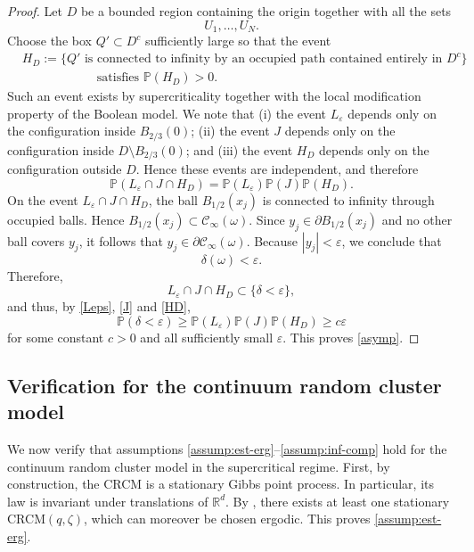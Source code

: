 \documentclass[11pt]{article}
\renewcommand{\P}{\mathbb P}
\theoremstyle{rem}
\begin{document}
\begin{proof}
\medskip

Let $D$ be a bounded region containing the origin together with all the sets
\[
U_1,\dots,U_N.
\]
Choose the box
$Q'\subset D^c$
sufficiently large so that the event
\begin{equation}\label{HD}
\begin{aligned}
&H_D
:=
\bigg\{
Q'
\text{ is connected to infinity by an occupied path contained entirely in }D^c
\bigg\} \\
&\qquad\qquad\qquad \mbox{satisfies $\P(H_D)>0$}. 
\end{aligned}
\end{equation}
Such an event exists by supercriticality together with the local modification property of the Boolean model. We note that (i) the event $L_\varepsilon$ depends only on the configuration inside
$B_{2/3}(0)$; (ii)
the event $J$ depends only on the configuration inside
$D\setminus B_{2/3}(0)$;
and (iii) the event $H_D$ depends only on the configuration outside $D$.
Hence these events are independent, and therefore
\[
\P(L_\varepsilon\cap J\cap H_D)
=
\P(L_\varepsilon)\P(J)\P(H_D).
\]
On the event
$L_\varepsilon\cap J\cap H_D$,
the ball $B_{1/2}(x_j)$
is connected to infinity through occupied balls. Hence
$B_{1/2}(x_j)\subset\mathcal C_\infty(\omega)$.
Since $y_j\in\partial B_{1/2}(x_j)$
and no other ball covers $y_j$, it follows that
$y_j\in\partial\mathcal C_\infty(\omega)$.
Because $|y_j|<\varepsilon$,
we conclude that
\[
\delta(\omega)<\varepsilon.
\]
Therefore,
\[
L_\varepsilon\cap J\cap H_D
\subset
\{\delta<\varepsilon\},
\]
and thus, by \eqref{Leps}, \eqref{J} and \eqref{HD}, 
\[
\P(\delta<\varepsilon)
\ge
\P(L_\varepsilon)\P(J)\P(H_D)
\ge
c\varepsilon
\]
for some constant $c>0$ and all sufficiently small $\varepsilon$. This proves \eqref{asymp}.
\end{proof}

\subsection{Verification for the continuum random cluster model}

We now verify that assumptions
\ref{assump:est-erg}--\ref{assump:inf-comp}
hold for the continuum random cluster model in the supercritical regime.
First, by construction, the CRCM is a stationary Gibbs point process. In particular, its law is invariant under translations of $\mathbb R^d$. By \cite[Theorem 1]{DH15}, there exists at least one stationary CRCM$(q,\zeta)$, which can moreover be chosen ergodic. This proves \ref{assump:est-erg}.
\end{document}
